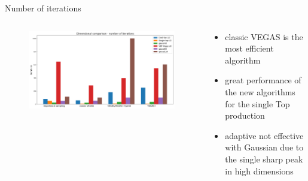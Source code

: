 \documentclass[t,handout,professionalfont,serif]{beamer}
\begin{document}
\begin{frame}{Number of iterations}
	
		\tiny
	\begin{columns}
		\begin{column}{0.7 \textwidth}
			\begin{figure}
				\includegraphics[width= \columnwidth]{iter_final.png}
			\end{figure}
			
		\end{column}
		\hspace{-0.5cm}
		\begin{column}{0.3 \textwidth}
			\vspace{1cm}
			
			\begin{itemize}
				
				\item classic VEGAS is the most efficient algorithm
				\item great performance of the new algorithms for the single Top production
				\item adaptive not effective with Gaussian due to the single sharp peak in high dimensions
			\end{itemize}
		\end{column}
	\end{columns}
	

	
\end{frame}
\end{document}
